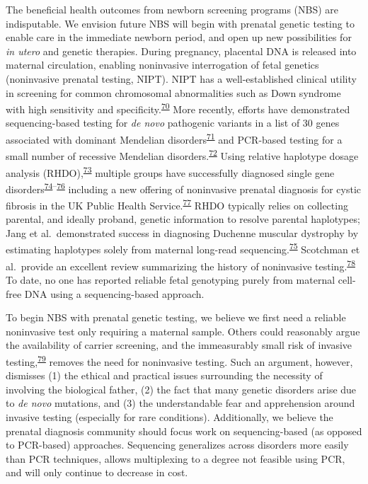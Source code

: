 \documentclass[11pt,letterpaper]{book}
\begin{document}
The beneficial health outcomes from newborn screening programs (NBS) are indisputable.
We envision future NBS will begin with prenatal genetic testing to enable care in the immediate newborn period, and open up new possibilities for \emph{in utero} and genetic therapies.
During pregnancy, placental DNA is released into maternal circulation, enabling noninvasive interrogation of fetal genetics (noninvasive prenatal testing, NIPT).
NIPT has a well-established clinical utility in screening for common chromosomal abnormalities such as Down syndrome with high sensitivity and specificity.\textsuperscript{\protect\hyperlink{ref-mackie:2017aa}{70}}
More recently, efforts have demonstrated sequencing-based testing for \emph{de novo} pathogenic variants in a list of 30 genes associated with dominant Mendelian disorders\textsuperscript{\protect\hyperlink{ref-zhang:2019aa}{71}} and PCR-based testing for a small number of recessive Mendelian disorders.\textsuperscript{\protect\hyperlink{ref-tsao:2019ab}{72}}
Using relative haplotype dosage analysis (RHDO),\textsuperscript{\protect\hyperlink{ref-lo:2010aa}{73}} multiple groups have successfully diagnosed single gene disorders\textsuperscript{\protect\hyperlink{ref-hui:2017aa}{74}--\protect\hyperlink{ref-vermeulen:2017aa}{76}} including a new offering of noninvasive prenatal diagnosis for cystic fibrosis in the UK Public Health Service.\textsuperscript{\protect\hyperlink{ref-chandler:2020aa}{77}}
RHDO typically relies on collecting parental, and ideally proband, genetic information to resolve parental haplotypes; Jang et al.~demonstrated success in diagnosing Duchenne muscular dystrophy by estimating haplotypes solely from maternal long-read sequencing.\textsuperscript{\protect\hyperlink{ref-jang:2018aa}{75}}
Scotchman et al.~provide an excellent review summarizing the history of noninvasive testing.\textsuperscript{\protect\hyperlink{ref-scotchman:2020aa}{78}}
To date, no one has reported reliable fetal genotyping purely from maternal cell-free DNA using a sequencing-based approach.

To begin NBS with prenatal genetic testing, we believe we first need a reliable noninvasive test only requiring a maternal sample.
Others could reasonably argue the availability of carrier screening, and the immeasurably small risk of invasive testing,\textsuperscript{\protect\hyperlink{ref-salomon:2019aa}{79}} removes the need for noninvasive testing.
Such an argument, however, dismisses (1) the ethical and practical issues surrounding the necessity of involving the biological father, (2) the fact that many genetic disorders arise due to \emph{de novo} mutations, and (3) the understandable fear and apprehension around invasive testing (especially for rare conditions).
Additionally, we believe the prenatal diagnosis community should focus work on sequencing-based (as opposed to PCR-based) approaches.
Sequencing generalizes across disorders more easily than PCR techniques, allows multiplexing to a degree not feasible using PCR, and will only continue to decrease in cost.
\end{document}

